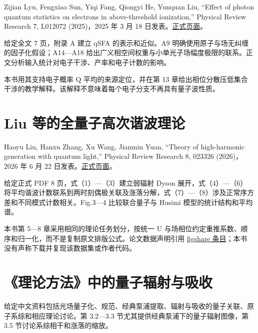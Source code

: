 \documentclass[UTF8,a4paper,zihao=-4,openany,fontset=fandol]{ctexbook}
\begin{document}
Zijian Lyu, Fengxiao Sun, Yiqi Fang, Qiongyi He, Yunquan Liu, “Effect of photon quantum statistics on electrons in above-threshold ionization,” Physical Review Research 7, L012072 (2025)，2025 年 3 月 18 日发表。\href{https://journals.aps.org/prresearch/abstract/10.1103/PhysRevResearch.7.L012072}{正式页面}。



给定全文 7 页，附录 A 建立 qSFA 的表示和近似。A9 明确使用原子与场无纠缠的因子化假设；A14—A18 给出广义相空间权重与小单光子场幅度极限的联系。正文分析输入统计对电子干涉、产率和电子计数的影响。



本书用其支持电子概率 Q 平均的来源定位，并在第 13 章给出相位分散压低集合干涉的教学解释。该解释不意味着每个电子分支不再具有量子波性质。



\section{Liu 等的全量子高次谐波理论}\label{sec:E:3}


Haoyu Liu, Hanxu Zhang, Xu Wang, Jianmin Yuan, “Theory of high-harmonic generation with quantum light,” Physical Review Research 8, 023326 (2026)，2026 年 6 月 22 日发表。\href{https://journals.aps.org/prresearch/abstract/10.1103/y3gr-tsns}{正式页面}。



给定正式 PDF 8 页，式（1）—（3）建立弱辐射 Dyson 展开，式（4）—（6）将平均谐波计数联系到两时刻偶极关联及涨落分解，式（7）—（8）涉及正常序方差和不同模式计数相关。Fig.3—4 比较联合量子与 Husimi 模型的统计结构和平均谱。



本书第 5—8 章采用相同的理论任务划分，按统一 U 与场相位约定重推系数、顺序和归一化，而不是复制原文排版公式。论文数据声明引用 \href{https://doi.org/10.6084/m9.figshare.32664744}{figshare 条目}；本书没有声称下载并复现该数据集或作者代码。



\section{《理论方法》中的量子辐射与吸收}\label{sec:E:4}


给定中文资料包括光场量子化、规范、经典泵浦提取、辐射与吸收的量子关联、原子系综和相应理论讨论。第 3.2—3.3 节尤其提供经典泵浦下的量子辐射图像，第 3.5 节讨论系综相干和涨落的缩放。
\end{document}
